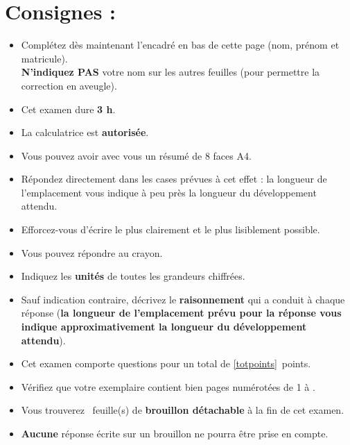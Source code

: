 \section*{Consignes :}
\begin{itemize}
\item Complétez dès maintenant l'encadré en bas de cette page (nom, prénom  et matricule).\\
\textbf{N'indiquez \textbf{PAS}} votre nom sur les autres feuilles (pour permettre la correction en aveugle).\\
\item Cet examen dure \textbf{3 h}.
\item La calculatrice est \textbf{autorisée}.
\item Vous pouvez avoir avec vous un résumé de 8 faces A4.
\item Répondez directement dans les cases prévues à cet effet : la longueur de l'emplacement vous indique à peu près la longueur du développement attendu.
\item Efforcez-vous d'écrire le plus clairement et le plus lisiblement possible.
\item Vous pouvez répondre au crayon.\\
\item Indiquez les \textbf{unités} de toutes les grandeurs chiffrées.
\item Sauf indication contraire, décrivez le \textbf{raisonnement} qui a conduit à chaque réponse (\textbf{la longueur de l'emplacement prévu pour la réponse vous indique approximativement la longueur du développement attendu}).\\
\item Cet examen comporte  questions pour un total de \ref{totpoints}~points. %
\item Vérifiez que votre exemplaire contient bien \pageref{LastPage} pages numérotées de 1 à \pageref{LastPage}.
\item Vous trouverez ~feuille(s) de \textbf{brouillon détachable} à la fin de cet examen.
\item \textbf{Aucune} réponse écrite sur un brouillon ne pourra être prise en compte.
\end{itemize}

